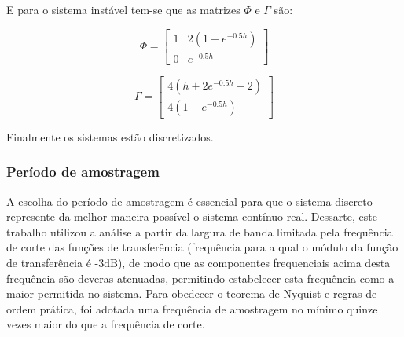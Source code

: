 E para o sistema instável tem-se que as matrizes $\Phi$ e $\Gamma$ são:

\begin{equation} \label{ins:5}
    \Phi= \begin{bmatrix} 1 & 2(1-e^{-0.5h})\\ 0 & e^{-0.5h} \end{bmatrix}
\end{equation}

\begin{equation} \label{ins:6}
    \Gamma = \begin{bmatrix} 4(h + 2e^{-0.5h} - 2)\\ 4(1-e^{-0.5h}) \end{bmatrix}
\end{equation}

Finalmente os sistemas estão discretizados.

\subsubsection{Período de amostragem}

A escolha do período de amostragem é essencial para que o sistema discreto represente da melhor maneira possível o sistema contínuo real. Dessarte, este trabalho utilizou a análise a partir da largura de banda limitada pela frequência de corte das funções de transferência (frequência para a qual o módulo da função de transferência é -3dB), de modo que as componentes frequenciais acima desta frequência são deveras atenuadas, permitindo estabelecer esta frequência como a maior permitida no sistema. Para obedecer o teorema de Nyquist e regras de ordem prática, foi adotada uma frequência de amostragem no mínimo quinze vezes maior do que a frequência de corte.

